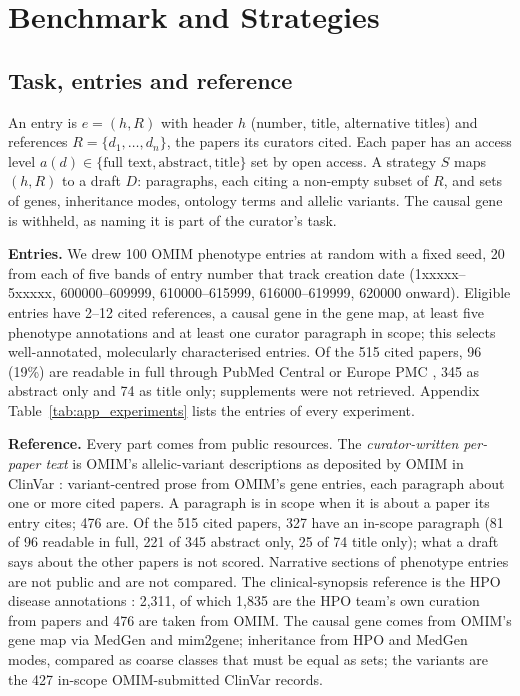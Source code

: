 \documentclass{article} %
\begin{document}
\section{Benchmark and Strategies}
\label{sec:method}
\subsection{Task, entries and reference}
\label{sec:task}
An entry is $e=(h,R)$ with header $h$ (number, title, alternative titles) and references $R=\{d_1,\dots,d_n\}$, the papers its curators cited. Each paper has an access level $a(d)\in\{\text{full text},\text{abstract},\text{title}\}$ set by open access. A strategy $S$ maps $(h,R)$ to a draft $D$: paragraphs, each citing a non-empty subset of $R$, and sets of genes, inheritance modes, ontology terms and allelic variants. The causal gene is withheld, as naming it is part of the curator's task.

\textbf{Entries.} We drew 100 OMIM phenotype entries at random with a fixed seed, 20 from each of five bands of entry number that track creation date (1xxxxx--5xxxxx, 600000--609999, 610000--615999, 616000--619999, 620000 onward). Eligible entries have 2--12 cited references, a causal gene in the gene map, at least five phenotype annotations and at least one curator paragraph in scope; this selects well-annotated, molecularly characterised entries. Of the 515 cited papers, 96 (19\%) are readable in full through PubMed Central or Europe PMC \citep{rosonovski2024europe}, 345 as abstract only and 74 as title only; supplements were not retrieved. Appendix Table~\ref{tab:app_experiments} lists the entries of every experiment.

\textbf{Reference.} Every part comes from public resources. The \emph{curator-written per-paper text} is OMIM's allelic-variant descriptions as deposited by OMIM in ClinVar \citep{landrum2025clinvar}: variant-centred prose from OMIM's gene entries, each paragraph about one or more cited papers. A paragraph is in scope when it is about a paper its entry cites; 476 are. Of the 515 cited papers, 327 have an in-scope paragraph (81 of 96 readable in full, 221 of 345 abstract only, 25 of 74 title only); what a draft says about the other papers is not scored. Narrative sections of phenotype entries are not public and are not compared. The clinical-synopsis reference is the HPO disease annotations \citep{gargano2024human}: 2,311, of which 1,835 are the HPO team's own curation from papers and 476 are taken from OMIM. The causal gene comes from OMIM's gene map via MedGen \citep{Louden2020MedgenNcbis} and mim2gene; inheritance from HPO and MedGen modes, compared as coarse classes that must be equal as sets; the variants are the 427 in-scope OMIM-submitted ClinVar records.
\end{document}
